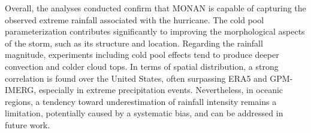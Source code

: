 Overall, the analyses conducted confirm that MONAN is capable of capturing the observed extreme rainfall associated with the hurricane. The cold pool parameterization contributes significantly to improving the morphological aspects of the storm, such as its structure and location. Regarding the rainfall magnitude, experiments including cold pool effects tend to produce deeper convection and colder cloud tops. In terms of spatial distribution, a strong correlation is found over the United States, often surpassing ERA5 and GPM-IMERG, especially in extreme precipitation events. Nevertheless, in oceanic regions, a tendency toward underestimation of rainfall intensity remains a limitation, potentially caused by a systematic bias, and can be addressed in future work.

